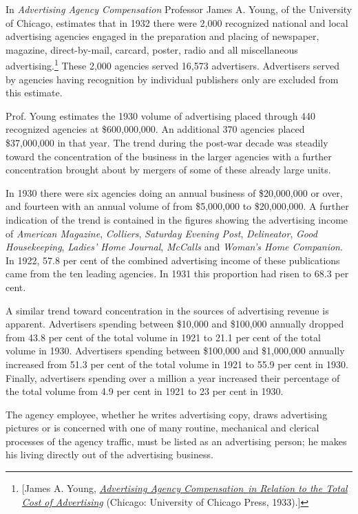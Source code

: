 \documentclass[openany,nobib]{tufte-book}
\begin{document}
In \emph{Advertising Agency Compensation} Professor James A. Young, of
the University of Chicago, estimates that in 1932 there were 2,000
recognized national and local advertising agencies engaged in the
preparation and placing of newspaper, magazine, direct-by-mail, carcard,
poster, radio and all miscellaneous advertising.\footnote{{[}James A. Young,
  \emph{\href{http://www.worldcat.org/oclc/3291593}{Advertising Agency
  Compensation}}\href{http://www.worldcat.org/oclc/3291593}{~}\emph{\href{http://www.worldcat.org/oclc/3291593}{in
  Relation to the Total Cost of Advertising}} (Chicago: University of
  Chicago Press, 1933).{]}} These 2,000 agencies
served 16,573 advertisers. Advertisers served by agencies having
recognition by individual publishers only are excluded from this
estimate.

Prof. Young estimates the 1930 volume of advertising placed through 440
recognized agencies at \$600,000,000. An additional 370 agencies placed
\$37,000,000 in that year. The trend during the post-war decade was
steadily toward the concentration of the business in the larger agencies
with a further concentration brought about by mergers of some of these
already large units.

In 1930 there were six agencies doing an annual business of \$20,000,000
or over, and fourteen with an annual volume of from \$5,000,000 to
\$20,000,000. A further indication of the trend is contained in the
figures showing the advertising income of \emph{American Magazine},
\emph{Colliers}, \emph{Saturday Evening Post}, \emph{Delineator},
\emph{Good Housekeeping}, \emph{Ladies' Home Journal}, \emph{McCalls}
and \emph{Woman's Home Companion}. In 1922, 57.8 per cent of the
combined advertising income of these publications came from the ten
leading agencies. In 1931 this proportion had risen to 68.3 per cent.

A similar trend toward concentration in the sources of advertising
revenue is apparent. Advertisers spending between \$10,000 and \$100,000
annually dropped from 43.8 per cent of the total volume in 1921 to 21.1
per cent of the total volume in 1930. Advertisers spending between
\$100,000 and \$1,000,000 annually increased from 51.3 per cent of the
total volume in 1921 to 55.9 per cent in 1930. Finally, advertisers
spending over a million a year increased their percentage of the total
volume from 4.9 per cent in 1921 to 23 per cent in 1930.

The agency employee, whether he writes advertising copy, draws
advertising pictures or is concerned with one of many routine,
mechanical and clerical processes of the agency traffic, must be listed
as an advertising person; he makes his living directly out of the
advertising business.
\end{document}
